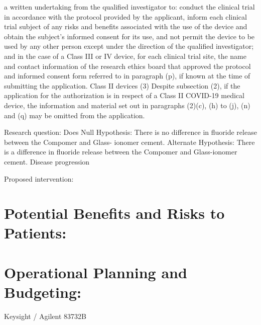 \documentclass[fleqn,10pt]{paper}
\begin{document}
a written undertaking from the qualified investigator to:
conduct the clinical trial in accordance with the protocol provided by the applicant,
inform each clinical trial subject of any risks and benefits associated with the use of the device and obtain the subject's informed consent for its use, and
not permit the device to be used by any other person except under the direction of the qualified investigator; and
in the case of a Class III or IV device, for each clinical trial site, the name and contact information of the research ethics board that approved the protocol and informed consent form referred to in paragraph (p), if known at the time of submitting the application.
Class II devices
(3) Despite subsection (2), if the application for the authorization is in respect of a Class II COVID-19 medical device, the information and material set out in paragraphs (2)‍(c), (h) to (j), (n) and (q) may be omitted from the application.







Research question: 
Does 
Null Hypothesis: There is no difference in fluoride release between the Compomer and Glass- ionomer cement.
Alternate Hypothesis: There is a difference in fluoride release between the Compomer and Glass-ionomer cement.
Disease progression

Proposed intervention:



\section{Potential Benefits and Risks to Patients:}

\section{Operational Planning and Budgeting:}



Keysight / Agilent 83732B
\end{document}
